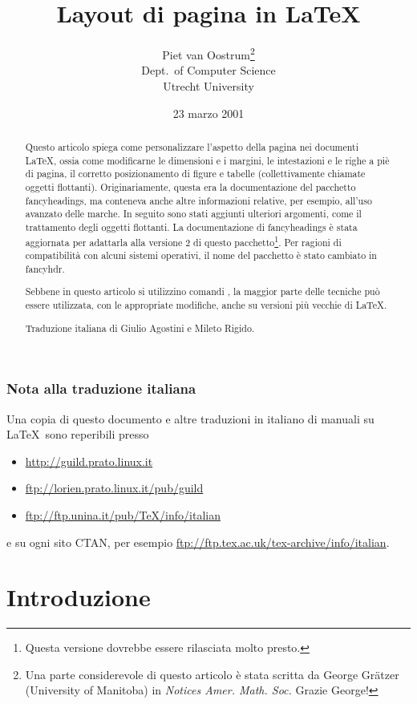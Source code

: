 \documentclass[a4paper,italian]{article}
\title{Layout di pagina in \LaTeX}
\author{Piet van Oostrum\thanks{Una parte considerevole di questo
    articolo \`e stata scritta da George Gr\"atzer (University of
    Manitoba) in \emph{Notices Amer. Math. Soc.}
    Grazie George!}\\
    Dept.\ of Computer Science\\
    Utrecht University}
\date{23 marzo 2001}
\begin{document}
\maketitle
\begin{abstract}
  Questo articolo spiega come personalizzare l'aspetto della pagina
  nei documenti LaTeX, ossia come modificarne le dimensioni e i
  margini, le intestazioni e le righe a pi\`e di pagina, il corretto
  posizionamento di figure e tabelle (collettivamente chiamate oggetti
  flottanti). Originariamente, questa era la documentazione del
  pacchetto \textsf{fancyheadings}, ma conteneva anche altre
  informazioni relative, per esempio, all'uso avanzato delle
  marche. In seguito sono stati aggiunti ulteriori argomenti, come il
  trattamento degli oggetti flottanti. La documentazione di
  \textsf{fancyheadings} \`e stata aggiornata per adattarla alla
  versione 2 di questo pacchetto\footnote{Questa versione dovrebbe
  essere rilasciata molto presto.}.  Per ragioni di compatibilit\`a
  con alcuni sistemi operativi, il nome del pacchetto \`e stato
  cambiato in \textsf{fancyhdr}.

  Sebbene in questo articolo si utilizzino comandi \LaTeXe{}, la
  maggior parte delle tecniche pu\`o essere utilizzata, con le
  appropriate modifiche, anche su versioni pi\`u vecchie di \LaTeX.

  Traduzione italiana di Giulio Agostini %
  e Mileto Rigido.                       %
\end{abstract}
\tableofcontents

\subsubsection*{Nota alla traduzione italiana}
Una copia di questo documento e altre traduzioni in italiano di
manuali su \LaTeX\ sono reperibili presso
\begin{itemize}
\item\url{http://guild.prato.linux.it}
\item\url{ftp://lorien.prato.linux.it/pub/guild}
\item\url{ftp://ftp.unina.it/pub/TeX/info/italian}
\end{itemize}
e su ogni sito CTAN, per esempio \url{ftp://ftp.tex.ac.uk/tex-archive/info/italian}.

\section{Introduzione}
\label{sec:intro}
\end{document}
